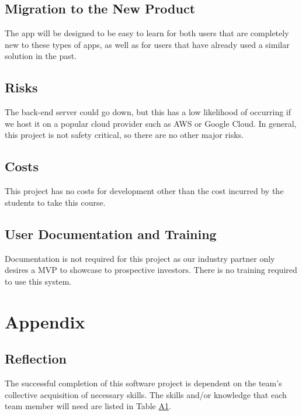 \documentclass[12pt]{article}
\begin{document}
\subsection{Migration to the New Product}

The app will be designed to be easy to learn for both users that are completely new to these types of apps, as well as for users that have already used a similar solution in the past.

\subsection{Risks}

The back-end server could go down, but this has a low likelihood of occurring if we host it on a popular cloud provider such as AWS or Google Cloud. In general, this project is not safety critical, so there are no other major risks.

\subsection{Costs}

This project has no costs for development other than the cost incurred by the students to take this course.

\subsection{User Documentation and Training}

Documentation is not required for this project as our industry partner only desires a MVP to showcase to prospective investors. There is no training required to use this system.

\newpage

\section{Appendix}
\setcounter{table}{0}
\renewcommand{\thetable}{A\arabic{table}}

\subsection{Reflection}
\label{sec:refAppendix}

The successful completion of this software project is dependent on  the team's collective acquisition of necessary skills. The skills and/or knowledge that each team member will need are listed in Table \hyperref[tab:reflectionSkills]{A1}.
\end{document}
